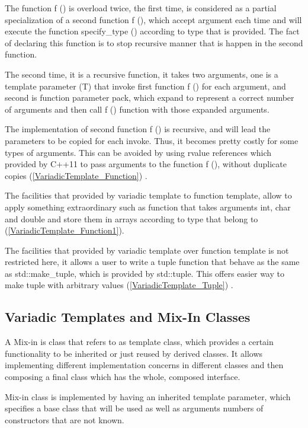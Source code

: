 \documentclass[11pt]{report}
\begin{document}
The function f () is overload twice, the first time, is considered as a partial specialization of a second function f (), which accept argument each time and will execute the function specify\_type () according to type that is provided.  The fact of declaring this function is to stop recursive manner that is happen in the second function.


The second time, it is a recursive function, it takes two arguments, one is a template parameter (T) that invoke first function f () for each argument, and second is function parameter pack, which expand to represent a correct number of arguments and then call f () function with those expanded arguments.


The implementation of second function f () is recursive, and will lead the parameters to be copied for each invoke. Thus, it becomes pretty costly for some types of arguments. This can be avoided by using rvalue references which provided by C++11 to pass arguments to the function f (), without duplicate copies (\ref{VariadicTemplate_Function}) \cite{Gregorie:professionalcpp}.


The facilities that provided by variadic template to function template, allow to apply something extraordinary such as function that takes arguments int, char and double and store them in arrays according to type that belong to (\ref{VariadicTemplate_Function1}).


The facilities that provided by variadic template over function template is not restricted here, it allows a user to write a tuple function that behave as the same as std::make\_tuple, which is provided by std::tuple. This offers easier way to make tuple with arbitrary values (\ref{VariadicTemplate_Tuple}) \cite{Gregorie:professionalcpp}.


\subsection{Variadic Templates and Mix-In Classes}
\label{subsection: Variadic Templates and Mix-In Classes}
A Mix-in is class that refers to as template class, which provides a certain functionality to be inherited or just reused by derived classes. It allows implementing different implementation concerns in different classes and then composing a final class which has the whole, composed interface.

Mix-in class is implemented by having an inherited template parameter, which specifies a base class that will be used as well as arguments numbers of constructors that are not known.
\end{document}
